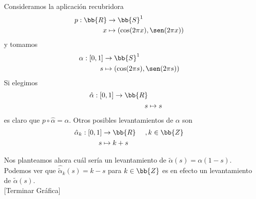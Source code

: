 \begin{ejemplo}
    Consideramos la aplicación recubridora
    \begin{align*}
        p:\bb{R} & \to \bb{S}^1\\
        x & \mapsto (\cos(2\pi x), \sen(2\pi x))
    \end{align*}
    y tomamos
    \begin{align*}
        \alpha: [0,1] & \to \bb{S}^1\\
        s & \mapsto (\cos(2\pi s), \sen(2\pi s))
    \end{align*}
    Si elegimos
    \begin{align*}
        \hat{\alpha} : [0,1] \to \bb{R}\\
        s & \mapsto s
    \end{align*}
    es claro que $p\circ \hat{\alpha} = \alpha$. Otros posibles levantamientos de $\alpha$ son 
    \begin{align*}
        \hat{\alpha}_k : [0,1] & \to \bb{R}\ \ \ \ , k\in \bb{Z}  \\
        s & \mapsto k+s
    \end{align*}
    
    Nos planteamos ahora cuál sería un levantamiento de $\tilde{\alpha}(s) = \alpha(1-s)$. Podemos ver que $\hat{\tilde{\alpha}}_k(s) = k-s$ para $k\in \bb{Z}$ es en efecto un levantamiento de $\tilde{\alpha}(s)$.\\

    [Terminar Gráfica]

    \begin{figure}[H]
        \centering
    \end{figure}%

\end{ejemplo}

